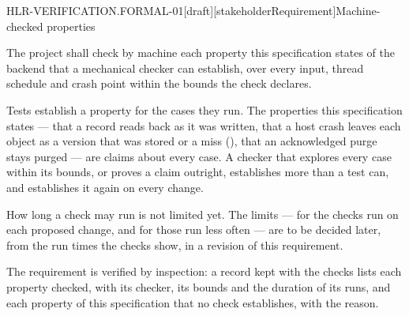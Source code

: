 \begin{requirement}{HLR-VERIFICATION.FORMAL-01}[draft][stakeholderRequirement]{Machine-checked properties}


  The project shall check by machine each property this specification
  states of the backend that a mechanical checker can establish, over every
  input, thread schedule and crash point within the bounds the check
  declares.

  Tests establish a property for the cases they run. The properties this
  specification states --- that a record reads back as it was written, that
  a host crash leaves each object as a version that was stored or a miss
  (), that an acknowledged purge stays
  purged --- are claims about every case. A checker that explores every case
  within its bounds, or proves a claim outright, establishes more than a test
  can, and establishes it again on every change.

  How long a check may run is not limited yet. The limits --- for the checks
  run on each proposed change, and for those run less often --- are to be
  decided later, from the run times the checks show, in a revision of this
  requirement.

  The requirement is verified by inspection: a record kept with the checks
  lists each property checked, with its checker, its bounds and the duration
  of its runs, and each property of this specification that no check
  establishes, with the reason.


\end{requirement}

